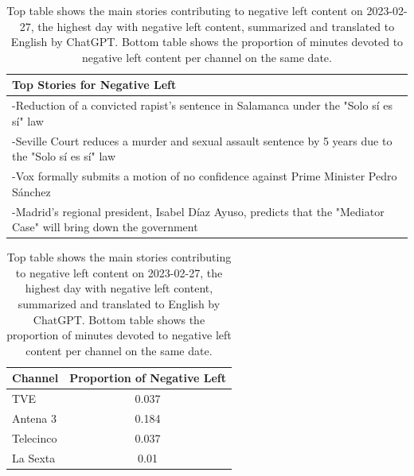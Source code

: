 \documentclass[12pt]{article}
\begin{document}
		\begin{table}[!htb]
		\centering
		\begin{tabular}{p{}}
			\toprule
			\textbf{Top Stories for  Negative Left}  \\
			\midrule
			-Reduction of a convicted rapist’s sentence in Salamanca under the "Solo sí es sí" law  \\
			-Seville Court reduces a murder and sexual assault sentence by 5 years due to the "Solo sí es sí" law  \\
			-Vox formally submits a motion of no confidence against Prime Minister Pedro Sánchez  \\
			-Madrid’s regional president, Isabel Díaz Ayuso, predicts that the "Mediator Case" will bring down the government  \\
			\bottomrule
		\end{tabular}
		\begin{tabular}{l c}
			\toprule
			\textbf{Channel} & \textbf{Proportion of Negative Left} \\
			\midrule
			TVE & 0.037 \\
			Antena 3  & 0.184 \\
			Telecinco  & 0.037 \\
			La Sexta  & 0.01 \\
			\bottomrule
		\end{tabular}
		\caption{Top table shows the main stories contributing to negative left content on 2023-02-27, the highest day with negative left content,  summarized and translated to English by ChatGPT. Bottom table shows the proportion of minutes devoted to negative left content per channel on the same date.}
		\label{tab:neg_left_channels}
	\end{table}
	
\end{document}
